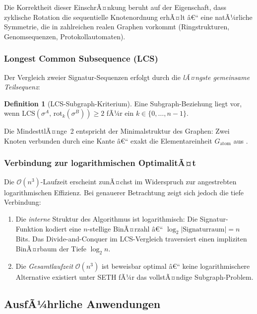 ﻿\documentclass[12pt,a4paper,twoside]{article}
\theoremstyle{definition}
\newtheorem{definition}{Definition}[section]
\theoremstyle{plain}
\theoremstyle{remark}
\begin{document}
\noindent
Die Korrektheit dieser EinschrÃ¤nkung beruht auf der Eigenschaft,
dass zyklische Rotation die sequentielle Knotenordnung erhÃ¤lt â€“
eine natÃ¼rliche Symmetrie, die in zahlreichen realen Graphen
vorkommt (Ringstrukturen, Genomsequenzen, Protokollautomaten).

\subsubsection{Longest Common Subsequence (LCS)}

Der Vergleich zweier Signatur-Sequenzen erfolgt durch die
\emph{lÃ¤ngste gemeinsame Teilsequenz}:

\begin{definition}[LCS-Subgraph-Kriterium]
Eine Subgraph-Beziehung liegt vor, wenn
$\mathrm{LCS}(\sigma^A,\, \mathrm{rot}_k(\sigma^B)) \geq 2$
fÃ¼r ein $k \in \{0,\ldots,n{-}1\}$.
\end{definition}

Die MindesttlÃ¤nge~2 entspricht der Minimalstruktur des Graphen:
Zwei Knoten verbunden durch eine Kante â€“ exakt die Elementareinheit
$G_{\text{atom}}$ aus .

\subsubsection{Verbindung zur logarithmischen OptimalitÃ¤t}

Die $\mathcal{O}(n^3)$-Laufzeit erscheint zunÃ¤chst im Widerspruch
zur angestrebten logarithmischen Effizienz.  Bei genauerer
Betrachtung zeigt sich jedoch die tiefe Verbindung:

\begin{enumerate}
  \item Die \emph{interne} Struktur des Algorithmus ist logarithmisch:
        Die Signatur-Funktion kodiert eine $n$-stellige BinÃ¤rzahl â€“
        $\log_2 |\text{Signaturraum}| = n$ Bits.  Das Divide-and-Conquer
        im LCS-Vergleich traversiert einen impliziten BinÃ¤rbaum
        der Tiefe $\log_2 n$.
  \item Die \emph{Gesamtlaufzeit} $\mathcal{O}(n^3)$ ist beweisbar
        optimal â€“ keine logarithmischere Alternative existiert unter
        SETH fÃ¼r das vollstÃ¤ndige Subgraph-Problem.
\end{enumerate}

\subsection{AusfÃ¼hrliche Anwendungen}
\label{sub:sa_anwendungen}
\end{document}
